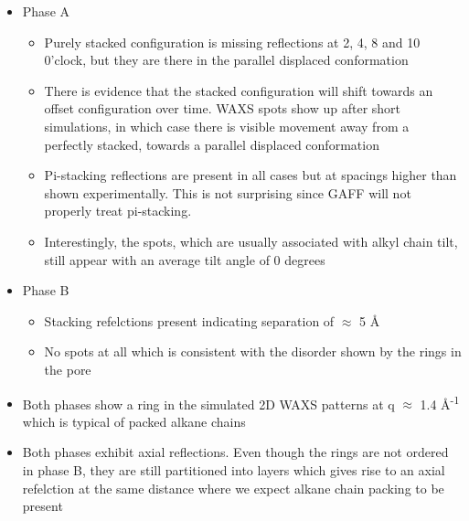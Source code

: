 \documentclass{article}
\newcommand{\angstrom}{\textup{\AA}}
\begin{document}
	\begin{itemize}
		\item Phase A
		\begin{itemize}	
			\item Purely stacked configuration is missing reflections at 2, 4, 8 and 10 0'clock, but they are there in the parallel displaced conformation
			\item There is evidence that the stacked configuration will shift towards an offset configuration over time. WAXS spots show up after short simulations, in which case there is visible movement away from a perfectly stacked, towards a parallel displaced conformation 
			\item Pi-stacking reflections are present in all cases but at spacings higher than shown experimentally. This is not surprising since GAFF will not properly treat pi-stacking.
			\item Interestingly, the spots, which are usually associated with alkyl chain tilt, still appear with an average tilt angle of 0 degrees
		\end{itemize}
		\item Phase B
		\begin{itemize}
			\item Stacking refelctions present indicating separation of $\approx$ 5 \angstrom
			\item No spots at all which is consistent with the disorder shown by the rings in the pore
		\end{itemize}
		\item Both phases show a ring in the simulated 2D WAXS patterns at q $\approx$ 1.4 \angstrom\textsuperscript{-1} which is typical of packed alkane chains
		\item Both phases exhibit axial reflections. Even though the rings are not ordered in phase B, 
they are still partitioned into layers which gives rise to an axial refelction at the same distance where we expect alkane chain packing to be present   
	\end{itemize} 
\end{document}
